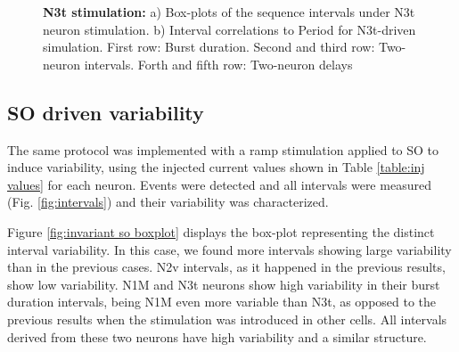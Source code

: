 \begin{figure}[hbt!]
\begin{minipage}[b]{0.53\textwidth}
\begin{minipage}[b]{\textwidth}
		\end{minipage}
	\end{minipage}
	\caption{\textbf{N3t stimulation:} a) Box-plots of the sequence intervals under N3t neuron stimulation. b) Interval correlations to Period for N3t-driven simulation. First row: Burst duration. Second and third row: Two-neuron intervals. Forth and fifth row: Two-neuron delays}
	\label{fig:invariant n3t test17}
\end{figure}





\subsection{SO driven variability}
\label{subsec:so driven}

The same protocol was implemented with a ramp stimulation applied to SO to induce variability, using the injected current values shown in Table \ref{table:inj values} for each neuron. Events were detected and all intervals were measured (Fig. \ref{fig:intervals}) and their variability was characterized. %

Figure \ref{fig:invariant so boxplot} displays the box-plot representing the distinct interval variability. In this case, we found more intervals showing large variability than in the previous cases. N2v intervals, as it happened in the previous results, show low variability. %
N1M and N3t neurons show high variability in their burst duration intervals, being N1M even more variable than N3t, as opposed to the previous results when the stimulation was introduced in other cells. All intervals derived from these two neurons have high variability and a similar structure. %




